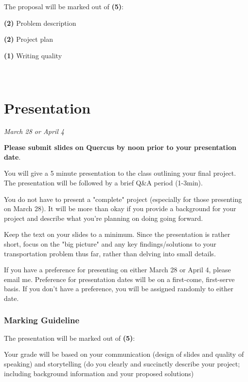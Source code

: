 \documentclass[11pt]{article}
\begin{document}
	The proposal will be marked out of \textbf{(5)}:
	
	\textbf{(2)} Problem description
	
	\textbf{(2)} Project plan
	
	\textbf{(1)} Writing quality



	\newpage
	
	
	
	\section*{\\Presentation}
	
	\textit{March 28 or April 4}
	
	\textbf{Please submit slides on Quercus by noon prior to your presentation date}.
	
	You will give a 5 minute presentation to the class outlining your final project. The presentation will be followed by a brief Q\&A period (1-3min).
	
	You do not have to present a "complete" project (especially for those presenting on March 28). It will be more than okay if you provide a background for your project and describe what you're planning on doing going forward.
	
	Keep the text on your slides to a minimum. Since the presentation is rather short, focus on the "big picture" and any key findings/solutions to your transportation problem thus far, rather than delving into small details.
	
	If you have a preference for presenting on either March 28 or April 4, please email me. Preference for presentation dates will be on a first-come, first-serve basis. If you don't have a preference, you will be assigned randomly to either date.
	
	
	\subsubsection*{Marking Guideline}
	
	The presentation will be marked out of \textbf{(5)}:
	
	Your grade will be based on your communication (design of slides and quality of speaking) and storytelling (do you clearly and succinctly describe your project; including background information and your proposed solutions)
	
	
	
	
	
\end{document}
